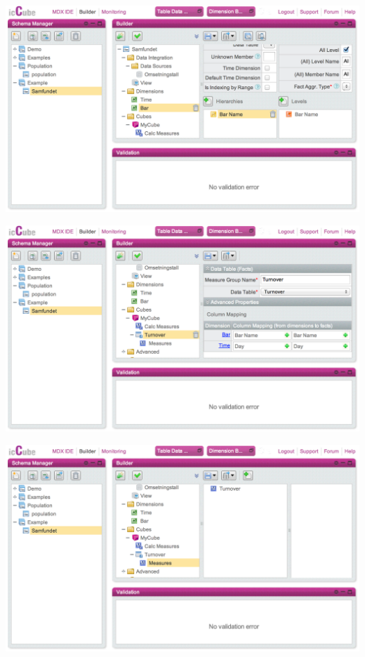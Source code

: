\documentclass[11pt,a4paper]{article}
\begin{document}
\vspace{2cm}
\noindent

\includegraphics[width=\textwidth]{bar_dimension}

\vspace{2cm}
\noindent

\includegraphics[width=\textwidth]{cube_setup}

\vspace{2cm}
\noindent

\includegraphics[width=\textwidth]{turnover_measure}
\end{document}
